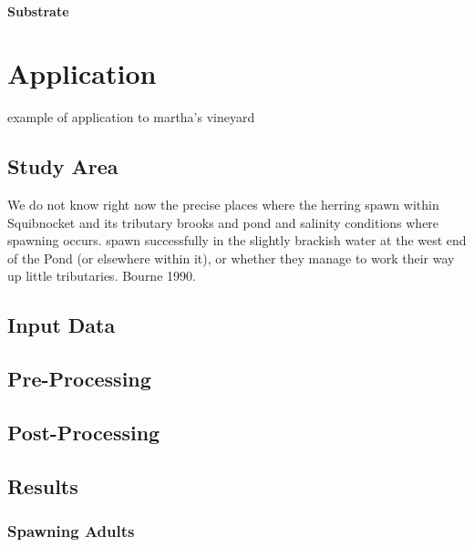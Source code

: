 \documentclass[
]{book}
\begin{document}
\hypertarget{substrate-8}{%
\subsubsection{Substrate}\label{substrate-8}}

\hypertarget{application}{%
\chapter{Application}\label{application}}

example of application to martha's vineyard

\hypertarget{study-area}{%
\section{Study Area}\label{study-area}}

We do not know right now the precise
places where the herring spawn within Squibnocket
and its tributary brooks and pond and salinity conditions where spawning occurs. spawn successfully in the slightly brackish water
at the west end of the Pond (or elsewhere within
it), or whether they manage to work their way up
little tributaries. Bourne 1990.

\hypertarget{input-data}{%
\section{Input Data}\label{input-data}}

\hypertarget{pre-processing}{%
\section{Pre-Processing}\label{pre-processing}}

\hypertarget{post-processing}{%
\section{Post-Processing}\label{post-processing}}

\hypertarget{results}{%
\section{Results}\label{results}}

\hypertarget{spawning-adults-2}{%
\subsection{Spawning Adults}\label{spawning-adults-2}}
\end{document}
